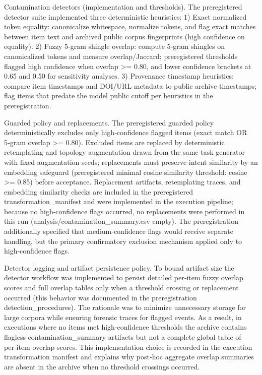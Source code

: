 \documentclass[conference]{IEEEtran}
\begin{document}
Contamination detectors (implementation and thresholds). The preregistered detector suite implemented three deterministic heuristics:
1) Exact normalized token equality: canonicalize whitespace, normalize tokens, and flag exact matches between item text and archived public corpus fingerprints (high confidence on equality).
2) Fuzzy 5‑gram shingle overlap: compute 5‑gram shingles on canonicalized tokens and measure overlap/Jaccard; preregistered thresholds flagged high confidence when overlap >= 0.80, and lower confidence brackets at 0.65 and 0.50 for sensitivity analyses.
3) Provenance timestamp heuristics: compare item timestamps and DOI/URL metadata to public archive timestamps; flag items that predate the model public cutoff per heuristics in the preregistration.

Guarded policy and replacements. The preregistered guarded policy deterministically excludes only high‑confidence flagged items (exact match OR 5‑gram overlap >= 0.80). Excluded items are replaced by deterministic retemplating and topology augmentation drawn from the same task generator with fixed augmentation seeds; replacements must preserve intent similarity by an embedding safeguard (preregistered minimal cosine similarity threshold: cosine >= 0.85) before acceptance. Replacement artifacts, retemplating traces, and embedding similarity checks are included in the preregistered transformation\_manifest and were implemented in the execution pipeline; because no high‑confidence flags occurred, no replacements were performed in this run (analysis/contamination\_summary.csv empty). The preregistration additionally specified that medium‑confidence flags would receive separate handling, but the primary confirmatory exclusion mechanism applied only to high‑confidence flags.

Detector logging and artifact persistence policy. To bound artifact size the detector workflow was implemented to persist detailed per‑item fuzzy overlap scores and full overlap tables only when a threshold crossing or replacement occurred (this behavior was documented in the preregistration detection\_procedures). The rationale was to minimize unnecessary storage for large corpora while ensuring forensic traces for flagged events. As a result, in executions where no items met high‑confidence thresholds the archive contains flagless contamination\_summary artifacts but not a complete global table of per‑item overlap scores. This implementation choice is recorded in the execution transformation manifest and explains why post‑hoc aggregate overlap summaries are absent in the archive when no threshold crossings occurred.
\end{document}
